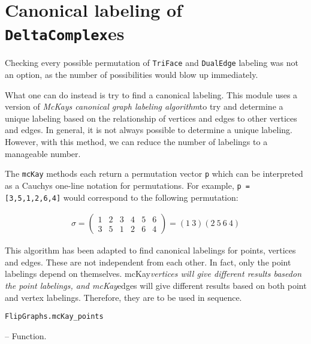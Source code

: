 \section{Canonical labeling of \texttt{DeltaComplex}es}



\label{7823929146850870815}{}


Checking every possible permutation of \texttt{TriFace} and \texttt{DualEdge} labeling was not an option, as the number of possibilities would blow up immediately. 



What one can do instead is try to find a canonical labeling. This module uses a version of \emph{McKay{\textquotesingle}s canonical graph labeling algorithm}\footnotemark[1] to try and determine a unique labeling based on the relationship of vertices and edges to other vertices and edges. In general, it is not always possible to determine a unique labeling. However, with this method, we can reduce the number of labelings to a manageable number.



The \texttt{mcKay} methods each return a permutation vector \texttt{p} which can be interpreted as a Cauchy{\textquotesingle}s one-line notation for permutations.  For example, \texttt{p = [3,5,1,2,6,4]} would correspond to the following permutation:



\begin{equation*}
\begin{split}σ = \begin{pmatrix}
1 & 2 & 3 & 4 & 5 & 6\\
3 & 5 & 1 & 2 & 6 & 4
\end{pmatrix} = (1\ 3)(2\ 5\ 6\ 4)\end{split}\end{equation*}


This algorithm has been adapted to find canonical labelings for points, vertices and edges. These are not independent from each other. In fact, only the point labelings depend on themselves. mcKay\emph{vertices will give different results basedon the point labelings, and mcKay}edges will give different results based on both point and vertex labelings. Therefore, they are to be used in sequence.


\hypertarget{17229019016549800560}{\texttt{FlipGraphs.mcKay\_points}}  -- {Function.}

